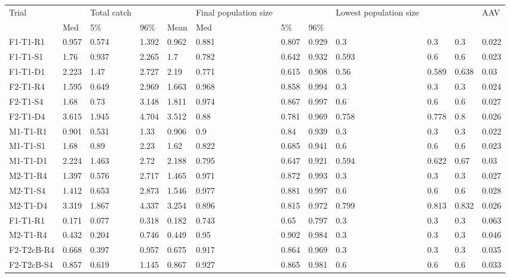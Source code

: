 \begin{table}[ht]
\centering
\begin{tabular}{llllllllllll}
  \hline
  \hline
Trial &  & Total catch &  &  & Final population size &  &  & Lowest population size &  &  & AAV \\ 
   & Med & 5\% & 96\% & Mean & Med & 5\% & 96\% &  &  &  &  \\ 
  F1-T1-R1 & 0.957 & 0.574 & 1.392 & 0.962 & 0.881 & 0.807 & 0.929 & 0.3 & 0.3 & 0.3 & 0.022 \\ 
  F1-T1-S1 & 1.76 & 0.937 & 2.265 & 1.7 & 0.782 & 0.642 & 0.932 & 0.593 & 0.6 & 0.6 & 0.023 \\ 
  F1-T1-D1 & 2.223 & 1.47 & 2.727 & 2.19 & 0.771 & 0.615 & 0.908 & 0.56 & 0.589 & 0.638 & 0.03 \\ 
  F2-T1-R4 & 1.595 & 0.649 & 2.969 & 1.663 & 0.968 & 0.858 & 0.994 & 0.3 & 0.3 & 0.3 & 0.024 \\ 
  F2-T1-S4 & 1.68 & 0.73 & 3.148 & 1.811 & 0.974 & 0.867 & 0.997 & 0.6 & 0.6 & 0.6 & 0.027 \\ 
  F2-T1-D4 & 3.615 & 1.945 & 4.704 & 3.512 & 0.88 & 0.781 & 0.969 & 0.758 & 0.778 & 0.8 & 0.026 \\ 
  M1-T1-R1 & 0.901 & 0.531 & 1.33 & 0.906 & 0.9 & 0.84 & 0.939 & 0.3 & 0.3 & 0.3 & 0.022 \\ 
  M1-T1-S1 & 1.68 & 0.89 & 2.23 & 1.62 & 0.822 & 0.685 & 0.941 & 0.6 & 0.6 & 0.6 & 0.023 \\ 
  M1-T1-D1 & 2.224 & 1.463 & 2.72 & 2.188 & 0.795 & 0.647 & 0.921 & 0.594 & 0.622 & 0.67 & 0.03 \\ 
  M2-T1-R4 & 1.397 & 0.576 & 2.717 & 1.465 & 0.971 & 0.872 & 0.993 & 0.3 & 0.3 & 0.3 & 0.027 \\ 
  M2-T1-S4 & 1.412 & 0.653 & 2.873 & 1.546 & 0.977 & 0.881 & 0.997 & 0.6 & 0.6 & 0.6 & 0.028 \\ 
  M2-T1-D4 & 3.319 & 1.867 & 4.337 & 3.254 & 0.896 & 0.815 & 0.972 & 0.799 & 0.813 & 0.832 & 0.026 \\ 
  F1-T1-R1 & 0.171 & 0.077 & 0.318 & 0.182 & 0.743 & 0.65 & 0.797 & 0.3 & 0.3 & 0.3 &    0.063  \\ 
  M2-T1-R4 & 0.432 & 0.204 & 0.746 & 0.449 & 0.95 & 0.902 & 0.984 & 0.3 & 0.3 & 0.3 &    0.046  \\ 
  F2-T2cB-R4 & 0.668 & 0.397 & 0.957 & 0.675 & 0.917 & 0.864 & 0.969 & 0.3 & 0.3 & 0.3 &    0.035  \\ 
  F2-T2cB-S4 & 0.857 & 0.619 & 1.145 & 0.867 & 0.927 & 0.865 & 0.981 & 0.6 & 0.6 & 0.6 &    0.033  \\ 

\end{tabular}
\end{table}
